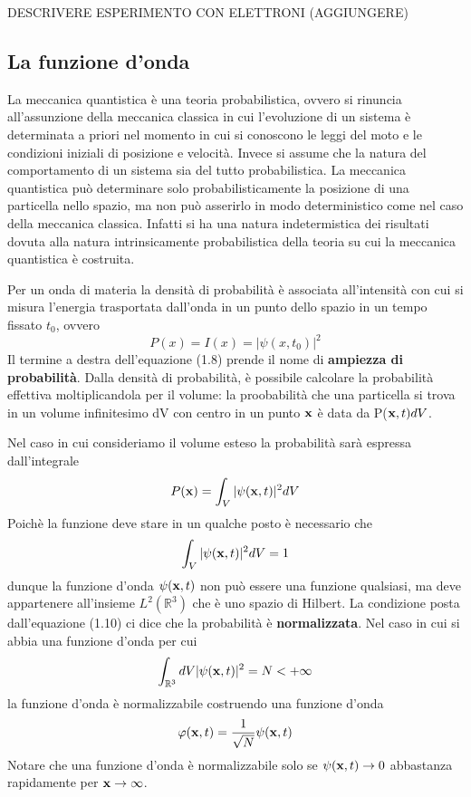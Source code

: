 DESCRIVERE ESPERIMENTO CON ELETTRONI (AGGIUNGERE)

\subsection{La funzione d'onda}
La meccanica quantistica \`e una teoria probabilistica, ovvero si rinuncia all'assunzione della meccanica classica in cui l'evoluzione di un sistema \`e determinata a priori nel momento in cui si conoscono le leggi del moto e le condizioni iniziali di posizione e velocit\`a. Invece si assume che la natura del comportamento di un sistema sia del tutto probabilistica. La meccanica quantistica pu\`o determinare solo probabilisticamente la posizione di una particella nello spazio, ma non pu\`o asserirlo in modo deterministico come nel caso della meccanica classica. Infatti si ha una natura indetermistica dei risultati dovuta alla natura intrinsicamente probabilistica della teoria su cui la meccanica quantistica \`e costruita.

Per un onda di materia la densit\`a di probabilit\`a \`e associata all'intensit\`a con cui si misura l'energia trasportata dall'onda in un punto dello spazio in un tempo fissato $t_0$, ovvero
\begin{equation}
	P(x) = I(x) = |\psi(x,t_0)|^2
\end{equation}
Il termine a destra dell'equazione (1.8) prende il nome di \textbf{ampiezza di probabilit\`a}. Dalla densit\`a di probabilit\`a, \`e possibile calcolare la probabilit\`a effettiva moltiplicandola per il volume: la proobabilit\`a che una particella si trova in un volume infinitesimo dV con centro in un punto $\bold{x}$ \`e data da P($\bold{x},t)dV$.

Nel caso in cui consideriamo il volume esteso la probabilit\`a sar\`a espressa dall'integrale 
\begin{equation}
	P(\bold{x}) = \int_{V}|\psi(\bold{x},t)|^2dV
\end{equation} 
Poich\`e la funzione deve stare in un qualche posto \`e necessario che 
\begin{equation}
	\int_{V}|\psi(\bold{x},t)|^2dV = 1
\end{equation}
dunque la funzione d'onda $\psi(\bold{x},t)$ non pu\`o essere una funzione qualsiasi, ma deve appartenere all'insieme $L^2(\mathbb{R}^3)$ che \`e uno spazio di Hilbert. La condizione posta dall'equazione (1.10) ci dice che la probabilit\`{a} \`e \textbf{normalizzata}. Nel caso in cui si abbia una funzione d'onda per cui 
\begin{equation*}
	\int_{\mathbb{R}^3}dV|\psi(\bold{x},t)|^2 = N < +\infty
\end{equation*}
la funzione d'onda \`e normalizzabile costruendo una funzione d'onda 
\begin{equation*}
	\varphi(\bold{x},t) = \frac{1}{\sqrt{N}}\psi(\bold{x},t)
\end{equation*}
Notare che una funzione d'onda \`e normalizzabile solo se $\psi(\bold{x},t) \to 0 $ abbastanza rapidamente per $\bold{x} \to \infty$.

